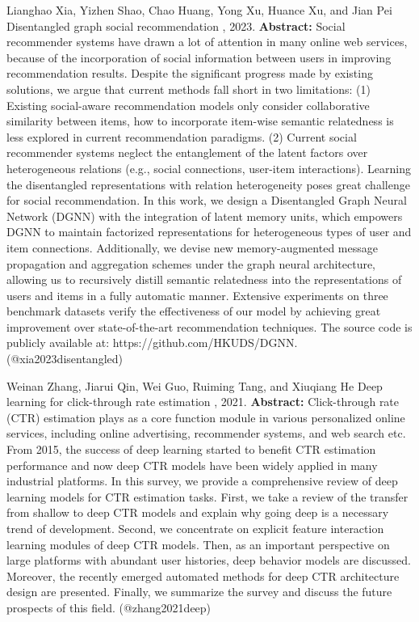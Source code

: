 \documentclass{article}
\begin{document}
\begin{thebibliography}{}
 Lianghao Xia, Yizhen Shao, Chao Huang, Yong Xu, Huance Xu, and Jian Pei \newblock Disentangled graph social recommendation , 2023. \newblock \textbf{Abstract:} Social recommender systems have drawn a lot of attention in many online web services, because of the incorporation of social information between users in improving recommendation results. Despite the significant progress made by existing solutions, we argue that current methods fall short in two limitations: (1) Existing social-aware recommendation models only consider collaborative similarity between items, how to incorporate item-wise semantic relatedness is less explored in current recommendation paradigms. (2) Current social recommender systems neglect the entanglement of the latent factors over heterogeneous relations (e.g., social connections, user-item interactions). Learning the disentangled representations with relation heterogeneity poses great challenge for social recommendation. In this work, we design a Disentangled Graph Neural Network (DGNN) with the integration of latent memory units, which empowers DGNN to maintain factorized representations for heterogeneous types of user and item connections. Additionally, we devise new memory-augmented message propagation and aggregation schemes under the graph neural architecture, allowing us to recursively distill semantic relatedness into the representations of users and items in a fully automatic manner. Extensive experiments on three benchmark datasets verify the effectiveness of our model by achieving great improvement over state-of-the-art recommendation techniques. The source code is publicly available at: https://github.com/HKUDS/DGNN. \newblock (@xia2023disentangled)

 Weinan Zhang, Jiarui Qin, Wei Guo, Ruiming Tang, and Xiuqiang He \newblock Deep learning for click-through rate estimation , 2021. \newblock \textbf{Abstract:} Click-through rate (CTR) estimation plays as a core function module in various personalized online services, including online advertising, recommender systems, and web search etc. From 2015, the success of deep learning started to benefit CTR estimation performance and now deep CTR models have been widely applied in many industrial platforms. In this survey, we provide a comprehensive review of deep learning models for CTR estimation tasks. First, we take a review of the transfer from shallow to deep CTR models and explain why going deep is a necessary trend of development. Second, we concentrate on explicit feature interaction learning modules of deep CTR models. Then, as an important perspective on large platforms with abundant user histories, deep behavior models are discussed. Moreover, the recently emerged automated methods for deep CTR architecture design are presented. Finally, we summarize the survey and discuss the future prospects of this field. \newblock (@zhang2021deep)


\end{thebibliography}
\end{document}
